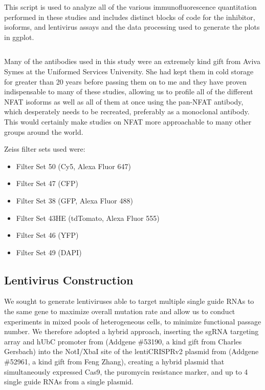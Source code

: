 \begin{code}
\caption{This script is used to analyze all of the various immunofluorescence quantitation performed in these studies and includes distinct blocks of code for the inhibitor, isoforms, and lentivirus assays and the data processing used to generate the plots in ggplot.}
\label{thp1analysis}

\inputminted[breaklines,frame=single,fontsize=\small]{r}{source/THP-1_Processing.R}

\end{code}

Many of the antibodies used in this study were an extremely kind gift from Aviva Symes at the Uniformed Services University. She had kept them in cold storage for greater than 20 years before passing them on to me and they have proven indispensable to many of these studies, allowing us to profile all of the different NFAT isoforms as well as all of them at once using the pan-NFAT antibody, which desperately needs to be recreated, preferably as a monoclonal antibody. This would certainly make studies on NFAT more approachable to many other groups around the world.

Zeiss filter sets used were:
\singlespacing 
\begin{itemize}
\item Filter Set 50 (Cy5, Alexa Fluor 647)
\item Filter Set 47 (CFP)
\item Filter Set 38 (GFP, Alexa Fluor 488)
\item Filter Set 43HE (tdTomato, Alexa Fluor 555)
\item Filter Set 46 (YFP)
\item Filter Set 49 (DAPI)
\end{itemize}
\doublespacing

\subsection{Lentivirus Construction}\label{lenti}

We sought to generate lentiviruses able to target multiple single guide RNAs to the same gene to maximize overall mutation rate and allow us to conduct experiments in mixed pools of heterogeneous cells, to minimize functional passage number. We therefore adopted a hybrid approach, inserting the sgRNA targeting array and hUbC promoter from \citet{Kabadi2014} (Addgene \#53190, a kind gift from Charles Gersbach) into the NotI/XbaI site of the lentiCRISPRv2 plasmid from \citet{Sanjana2014} (Addgene \#52961, a kind gift from Feng Zhang), creating a hybrid plasmid that simultaneously expressed Cas9, the puromycin resistance marker, and up to 4 single guide RNAs from a single plasmid.


